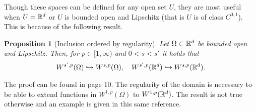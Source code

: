\documentclass[12pt]{article}
\newtheorem{proposition}[theorem]{Proposition}
\theoremstyle{definition}
\begin{document}
Though these spaces can be defined for any open set $U$, they are most useful when $U=\mathbb{R}^d$ or $U$  is bounded open and Lipschitz (that is $U$ is of class $C^{0,1}$). This is because of the following result.
\begin{proposition}[Inclusion ordered by regularity]
  Let  $\Omega \subset \mathbb{R}^d$ be bounded open and Lipschitz. Then, for $p \in [1,\infty)$ and $0<s<s'$ it holds that
  \begin{align*}
    W^{s',p}(\Omega )\hookrightarrow W^{s,p}(\Omega ), \quad W^{s',p}(\mathbb{R}^d)\hookrightarrow W^{s,p}(\mathbb{R}^d).
  \end{align*}
\end{proposition}
The proof can be found in \cite{di2012hitchhiker's} page 10. The regularity of the domain is necessary to be able to extend functions in $W^{1,p}(\Omega )$ to $W^{1,p}(\mathbb{R}^d)$. The result is not true otherwise and an example is given in this same reference.
\end{document}
